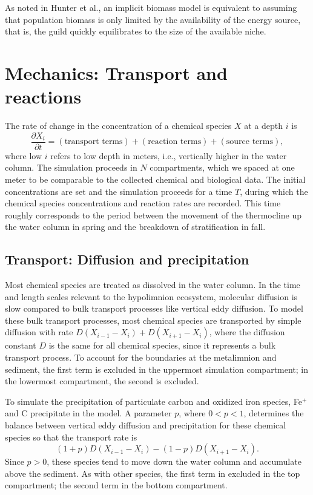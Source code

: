 \documentclass{report}
\begin{document}
As noted in Hunter et al.\cite{hunterkinetic1998}, an implicit biomass model is equivalent to assuming that population
biomass is only limited by the availability of the energy source, that is, the guild
quickly equilibrates to the size of the available niche.

\section{Mechanics: Transport and reactions}
The rate of change in the concentration of a chemical species $X$ at a depth $i$ is
\begin{equation}
  \frac{\partial X_i}{\partial t} = \left( \text{transport terms} \right) + \left(
  \text{reaction terms} \right) + \left(\text{source terms}\right),
\end{equation}
where low $i$ refers to low depth in meters, i.e., vertically higher in the water column.
The simulation proceeds in $N$ compartments, which we spaced at one meter to be comparable
to the collected chemical and biological data. The initial concentrations are set and the
simulation proceeds for a time $T$, during which the chemical species concentrations and
reaction rates are recorded. This time roughly corresponds to the period between the
movement of the thermocline up the water column in spring and the breakdown of
stratification in fall.

\subsection{Transport: Diffusion and precipitation}
Most chemical species are treated as dissolved in the water column. In the time and length scales relevant to the hypolimnion ecosystem, molecular diffusion is slow compared to bulk transport processes like vertical eddy diffusion. To model these bulk transport processes, most chemical species are transported by simple diffusion with rate $D \left(X_{i-1} - X_i\right) + D \left(X_{i+1} - X_i \right)$, where the diffusion constant $D$ is the same for all chemical species, since it represents a bulk transport process. To account for the boundaries at the metalimnion and sediment, the first term is excluded in the uppermost simulation compartment; in the lowermost compartment, the second is excluded.

To simulate the precipitation of particulate carbon and oxidized iron species, Fe$^+$ and C precipitate in the model. A parameter $p$, where $0 < p < 1$,
determines the balance between vertical eddy diffusion and precipitation for these chemical species so that
the transport rate is
\begin{equation}
  (1 + p) D \left(X_{i-1} - X_i\right) - (1-p) D \left(X_{i+1} - X_i\right).
\end{equation}
Since $p > 0$, these species tend to move down the water column and accumulate above the sediment. As with other species, the first
term in excluded in the top compartment; the second term in the bottom compartment.
\end{document}
